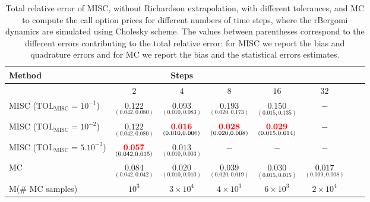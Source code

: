 \documentclass[11pt]{article}
\begin{document}
\begin{table}[h!]
	\centering
	\begin{tabular}{l*{6}{c}r}
	\toprule[1.5pt]
	Method & & Steps  & & &    \\
	\hline
		    & $2$ & $4$ & $8$  & $16$   & $32$ \\
		\hline

		MISC ($\text{TOL}_{\text{MISC}}=10^{-1}$)  & $\underset{(0.042,0.080)}{\mathbf{0.122}}$& $ \underset{(0.010,0.083)}{\mathbf{0.093}}$ & $ \underset{(0.020,0.173)}{\mathbf{0.193}}$   & $ \underset{(0.015,0.135)}{\mathbf{  0.150}}$  &$-$ \\

		MISC ($\text{TOL}_{\text{MISC}}=10^{-2}$)  & $\underset{(0.042,0.080)}{\mathbf{ 0.122}}$ & $ \underset{(0.010,0.006)}{\mathbf{{\color{red}0.016}}}$ & $\underset{(0.020,0.008)}{\mathbf{ {\color{red}0.028}  }}$&  $ \underset{(0.015,0.014)}{\mathbf{{\color{red}0.029}}}$ &$-$ \\
		MISC ($\text{TOL}_{\text{MISC}}=5.10^{-3}$)  & $\underset{(0.042,0.015)}{\mathbf{ {\color{red}0.057}}}$ & $ \underset{(0.010,0.003)}{\mathbf{0.013 }}$ & $-$&  $-$&$-$  \\

				\hline
				MC    & $\underset{(0.042,0.042)}{\mathbf{0.084}}$  & $\underset{(0.010,0.010)}{\mathbf{0.020}}$  &$\underset{(0.020,0.019)}{
				\mathbf{0.039}}$& $\underset{(0.015,0.015)}{
				\mathbf{0.030}}$ &$\underset{(0.009,0.008)}{
				\mathbf{0.017}}$\\	
		M(\# MC samples)   & $10^3$  & $3 \times 10^4$  &$4 \times 10^3$  & $6 \times 10^3$  & $2 \times 10^4$\\
		\bottomrule[1.25pt]
	\end{tabular}
	\caption{Total relative error of MISC, without Richardson extrapolation, with different tolerances, and MC to compute the call option prices for different numbers of time steps, where the rBergomi dynamics are simulated using Cholesky scheme. The values between parentheses correspond to the different errors contributing to the total relative error: for MISC we report the bias and quadrature errors and for MC we report the bias and the statistical errors estimates.}
	\label{Total error of MISC and MC to compute Call option price of the different tolerances for different number of time steps_Cholesky. Case $K=1$, $H=0.07$, without Richardson extrapolation. The numbers between parentheses are the corresponding absolute errors,linear}
\end{table}
\FloatBarrier
\end{document}
